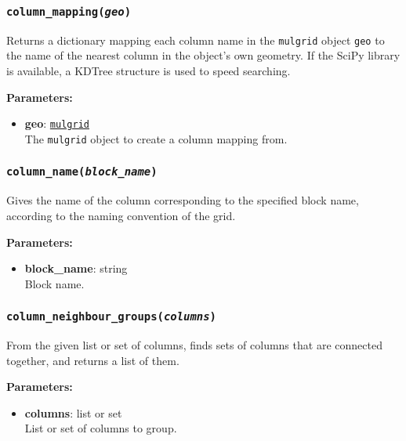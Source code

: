 \begin{snugshade}\subsubsection{\texttt{column\_mapping(\emph{geo})}}\end{snugshade}
\label{sec:mulgrid:column_mapping}

Returns a dictionary mapping each column name in the \texttt{mulgrid} object \texttt{geo} to the name of the nearest column in the object's own geometry.  If the SciPy library is available, a KDTree structure is used to speed searching.

\textbf{Parameters:}
\begin{itemize}
\item \textbf{geo}: \hyperref[mulgrids]{\texttt{mulgrid}}\\
  The \texttt{mulgrid} object to create a column mapping from.
\end{itemize}

\begin{snugshade}\subsubsection{\texttt{column\_name(\emph{block\_name})}}\end{snugshade}
\label{sec:mulgrid:column_name}

Gives the name of the column corresponding to the specified block name, according to the naming convention of the grid.

\textbf{Parameters:}
\begin{itemize}
\item \textbf{block\_name}: string\\
  Block name.
\end{itemize}

\begin{snugshade}\subsubsection{\texttt{column\_neighbour\_groups(\emph{columns})}}\end{snugshade}
\label{sec:mulgrid:column_neighbour_groups}

From the given list or set of columns, finds sets of columns that are connected together, and returns a list of them.

\textbf{Parameters:}
\begin{itemize}
\item \textbf{columns}: list or set\\
  List or set of columns to group.
\end{itemize}

